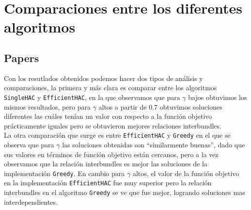 \section{Comparaciones entre los diferentes algoritmos}
\subsection{Papers}
Con los resutlados obtenidos podemos hacer dos tipos de análisis y comparaciones, la primera y más 
clara es comparar entre los algoritmos \texttt{SingleHAC} y \texttt{EfficientHAC}, en la que 
observamos que para $\gamma$ bajos obtuvimos los mismos resultados, pero para $\gamma$ altos a 
partir de $0.7$ obtuvimos soluciones diferentes las cuáles tenían un valor con respecto a la 
función objetivo prácticamente iguales pero se obtuvieron mejores relaciones interbundles.\\
La otra comparación que surge es entre \texttt{EfficientHAC} y \texttt{Greedy} en el que se observa 
que para $\gamma$ las soluciones obtenidas son \textquotedblleft similarmente 
buenas\textquotedblright , dado que sus valores en términos de función objetivo están cercanos, 
pero a la vez observamos que la relación interbundles es mejor las soluciones de la implementación 
\texttt{Greedy}. En cambio para $\gamma$ altos, el valor de la función objetivo en la 
implementación \texttt{EfficientHAC} fue muy superior pero la relación interbundles en el algoritmo 
\texttt{Greedy} se ve que fue mejor, logrando soluciones mas interdependientes.

